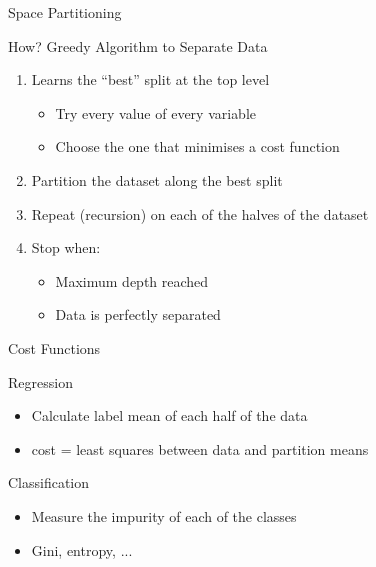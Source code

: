 \documentclass{beamer}
\begin{document}

\begin{frame}{Space Partitioning}

  \begin{center}
  \end{center}
  
\end{frame}

\begin{frame}{How?}
  Greedy Algorithm to Separate Data
  \begin{enumerate}
    \item Learns the ``best'' split at the top level
      \begin{itemize}
      \item Try every value of every variable
      \item Choose the one that minimises a cost function
      \end{itemize}
    \item Partition the dataset along the best split
    \item Repeat (recursion) on each of the halves of the dataset
    \item Stop when:
      \begin{itemize}
      \item Maximum depth reached
      \item Data is perfectly separated
      \end{itemize}
  \end{enumerate}
\end{frame}

\begin{frame}{Cost Functions}

  Regression
  \begin{itemize}
    \item Calculate label mean of each half of the data
    \item cost = least squares between data and partition means
  \end{itemize}

  Classification
  \begin{itemize}
    \item Measure the impurity of each of the classes
    \item Gini, entropy, ...
  \end{itemize}

\end{frame}
\end{document}
